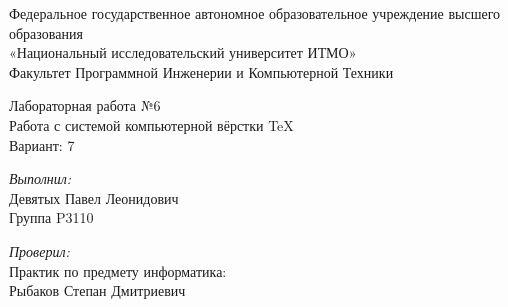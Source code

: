 \documentclass[12pt, a4paper]{article}
\begin{document}
\fancyhf{} 
\pagecolor[rgb]{1,1,1}
\begin{center}
\Large Федеральное государственное автономное образовательное учреждение высшего образования\\ «Национальный исследовательский университет ИТМО»\\
Факультет Программной Инженерии и Компьютерной Техники\\
\hfill 


\vspace{7cm}
\Large Лабораторная работа №6 \\
Работа с системой компьютерной вёрстки \TeX\\
Вариант: 7\\
\end{center}

\vspace{7.5cm}
 
\begin{flushright}
\textit{Выполнил:}\\
Девятых Павел Леонидович\\
Группа P3110\

\textit{Проверил:}\\
Практик по предмету информатика:\\
Рыбаков Степан Дмитриевич\\
\end{flushright}
 
\vfill
\end{document}
